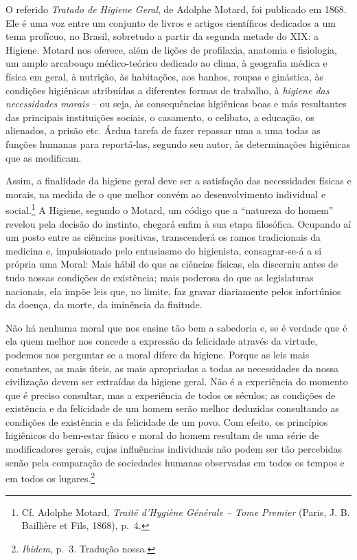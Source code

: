 O referido \emph{Tratado de Higiene Geral}, de Adolphe Motard, foi
publicado em 1868. Ele é uma voz entre um conjunto de livros e artigos
científicos dedicados a um tema profícuo, no Brasil, sobretudo a partir
da segunda metade do XIX: a Higiene. Motard nos oferece, além de lições
de profilaxia, anatomia e fisiologia, um amplo arcabouço médico-teórico
dedicado ao clima, à geografia médica e física em geral, à nutrição, às
habitações, aos banhos, roupas e ginástica, às condições higiênicas
atribuídas a diferentes formas de trabalho, à \emph{higiene das
necessidades morais} -- ou seja, às consequências higiênicas boas e más
resultantes das principais instituições sociais, o casamento, o
celibato, a educação, os alienados, a prisão etc. Árdua tarefa de fazer
repassar uma a uma todas as funções humanas para reportá-las, segundo
seu autor, às determinações higiênicas que as modificam.

Assim, a finalidade da higiene geral deve ser a satisfação das
necessidades físicas e morais, na medida de o que melhor convém ao
desenvolvimento individual e social.\footnote{Cf. Adolphe Motard,
  \emph{Traité d'Hygiène Générale -- Tome Premier} (Paris, J. B.
  Baillière et Fils, 1868), p.~4.} A Higiene, segundo o Motard, um
código que a ``natureza do homem'' revelou pela decisão do instinto,
chegará enfim à sua etapa filosófica. Ocupando aí um posto entre as
ciências positivas, transcenderá os ramos tradicionais da medicina e,
impulsionado pelo entusiasmo do higienista, consagrar-se-á a si própria
uma Moral: Mais hábil do que as ciências físicas, ela discerniu antes de
tudo nossas condições de existência; mais poderosa do que as
legislaturas nacionais, ela impõe leis que, no limite, faz gravar
diariamente pelos infortúnios da doença, da morte, da iminência da
finitude.

Não há nenhuma moral que nos ensine tão bem a sabedoria e, se é verdade
que é ela quem melhor nos concede a expressão da felicidade através da
virtude, podemos nos perguntar se a moral difere da higiene. Porque as
leis mais constantes, as mais úteis, as mais apropriadas a todas as
necessidades da nossa civilização devem ser extraídas da higiene geral.
Não é a experiência do momento que é preciso consultar, mas a
experiência de todos os séculos; as condições de existência e da
felicidade de um homem serão melhor deduzidas consultando as condições
de existência e da felicidade de um povo. Com efeito, os princípios
higiênicos do bem-estar físico e moral do homem resultam de uma série de
modificadores gerais, cujas influências individuais não podem ser tão
percebidas senão pela comparação de sociedades humanas observadas em
todos os tempos e em todos os lugares.\footnote{\emph{Ibidem}, p.~3.
  Tradução nossa.}

